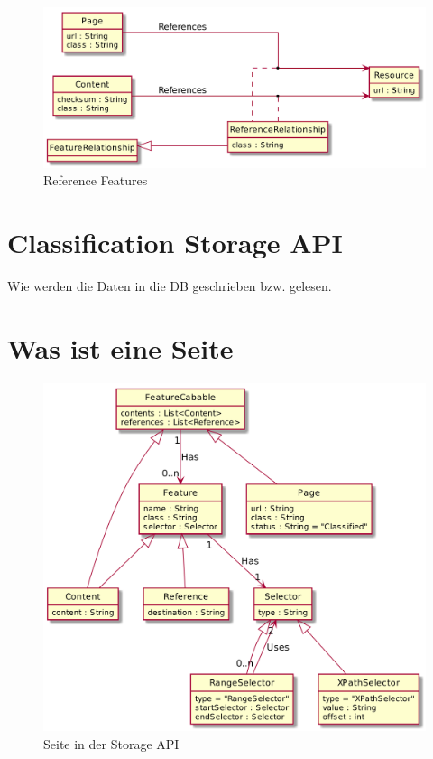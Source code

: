             \begin{figure}
                \centering
                \includegraphics[width=\textwidth]{../resources/db-data-model/resource-relationship.png}
                \caption{Reference Features}
                \label{image:dbDataModelResourceRelationship}
            \end{figure}

        \section{Classification Storage API}
            Wie werden die Daten in die DB geschrieben bzw. gelesen.

            \section{Was ist eine Seite}
                \begin{figure}
                    \centering
                    \includegraphics[width=\textwidth]{../resources/storage-api-data-model/page.png}
                    \caption{Seite in der Storage API}
                    \label{image:storageApiPageModel}
                \end{figure}